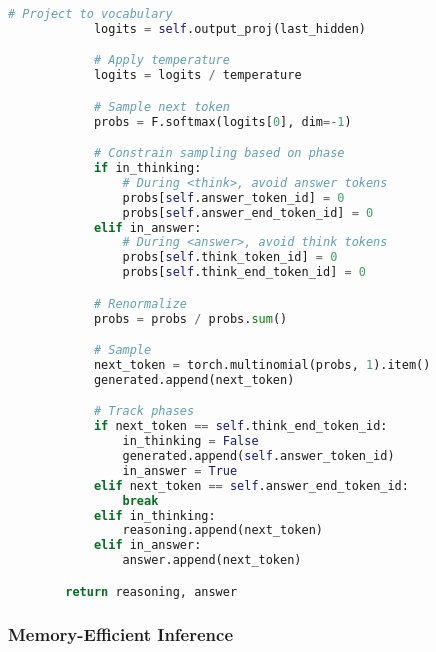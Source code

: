 \documentclass[11pt]{article}
\begin{document}
\begin{lstlisting}[language=Python, caption=Proper Autoregressive Reasoning Generation]
            # Project to vocabulary
            logits = self.output_proj(last_hidden)

            # Apply temperature
            logits = logits / temperature

            # Sample next token
            probs = F.softmax(logits[0], dim=-1)

            # Constrain sampling based on phase
            if in_thinking:
                # During <think>, avoid answer tokens
                probs[self.answer_token_id] = 0
                probs[self.answer_end_token_id] = 0
            elif in_answer:
                # During <answer>, avoid think tokens
                probs[self.think_token_id] = 0
                probs[self.think_end_token_id] = 0

            # Renormalize
            probs = probs / probs.sum()

            # Sample
            next_token = torch.multinomial(probs, 1).item()
            generated.append(next_token)

            # Track phases
            if next_token == self.think_end_token_id:
                in_thinking = False
                generated.append(self.answer_token_id)
                in_answer = True
            elif next_token == self.answer_end_token_id:
                break
            elif in_thinking:
                reasoning.append(next_token)
            elif in_answer:
                answer.append(next_token)

        return reasoning, answer
\end{lstlisting}

\subsubsection{Memory-Efficient Inference}
\end{document}
